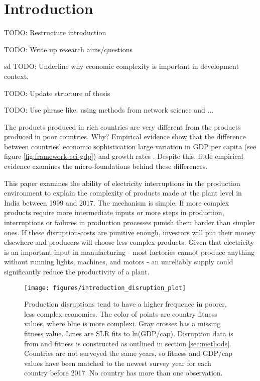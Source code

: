 \documentclass[11pt]{article}
\begin{document}
% 






\section{Introduction}\label{sec:introduction}

TODO: Restructure introduction

TODO: Write up research aims/questions

sd 
TODO: Underline why economic complexity is important in development context.

TODO: Update structure of thesis

TODO: Use phrase like: using methods from network science and ...

The products produced in rich countries are very different from the products produced in poor countries. Why? Empirical evidence show that the difference between countries' economic sophistication large variation in GDP per capita (see figure \ref{fig:framework-eci-gdp}) and growth rates \citep{tacchella_dynamical_2018}. Despite this, little empirical evidence examines the micro-foundations behind these differences. 

This paper examines the ability of electricity interruptions in the production environment to explain the complexity of products made at the plant level in India between 1999 and 2017. The mechanism is simple. If more complex products require more intermediate inputs or more steps in production, interruptions or failures in production processes punish them harder than simpler ones. If these disruption-costs are punitive enough, investors will put their money elsewhere and producers will choose less complex products. Given that electricity is an important input in manufacturing -  most factories cannot produce anything without running lights, machines, and motors - an unreliably supply could significantly reduce the productivity of a plant.

\begin{figure}[htpb]
	\centering
	\texttt{[image: figures/introduction\_disruption\_plot]}
	\caption{Production disruptions tend to have a higher frequence in poorer, less complex economies. The color of points are country fitness values, where blue is more complexi. Gray crosses has a missing fitness value. Lines are SLR fits to ln(GDP/cap). Disruption data is from \cite{world_bank_enterprise_2020} and fitness is constructed as outlined in section \ref{sec:methods}. Countries are not surveyed the same years, so fitness and GDP/cap values have been matched to the newest survey year for each country before 2017. No country has more than one observation.}
	\label{fig:disruption-fig}
\end{figure}
\end{document}
